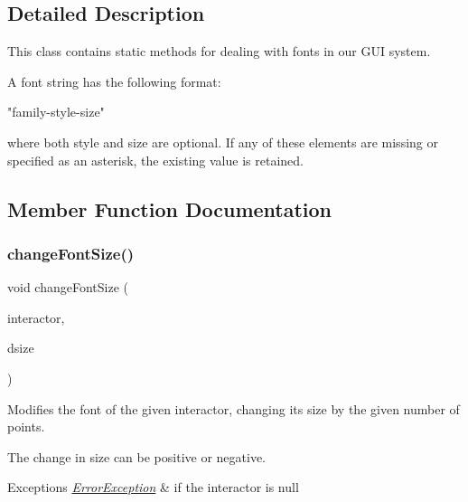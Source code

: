 \subsection{Detailed Description}
This class contains static methods for dealing with fonts in our G\+UI system. 

A font string has the following format\+:


\begin{DoxyPre}
"family-style-size"
\end{DoxyPre}


where both {\ttfamily style} and {\ttfamily size} are optional. If any of these elements are missing or specified as an asterisk, the existing value is retained. 

\subsection{Member Function Documentation}
\mbox{\label{classGFont_ae6714d087455b3431d6dce6f1202659f}} 
\subsubsection{\texorpdfstring{change\+Font\+Size()}{changeFontSize()}\hspace{0.1cm}{\footnotesize\ttfamily [1/2]}}
{\footnotesize\ttfamily void change\+Font\+Size (\begin{DoxyParamCaption}\item[{\mbox{\hyperlink{classGInteractor}{G\+Interactor}} $\ast$}]{interactor,  }\item[{int}]{dsize }\end{DoxyParamCaption})\hspace{0.3cm}{\ttfamily [static]}}



Modifies the font of the given interactor, changing its size by the given number of points. 

The change in size can be positive or negative. 
\begin{DoxyExceptions}{Exceptions}
{\em \mbox{\hyperlink{classErrorException}{Error\+Exception}}} & if the interactor is null \\
\hline
\end{DoxyExceptions}
\mbox{\label{classGFont_a1f55c64940d99e62528d5bfc634123f8}} 
